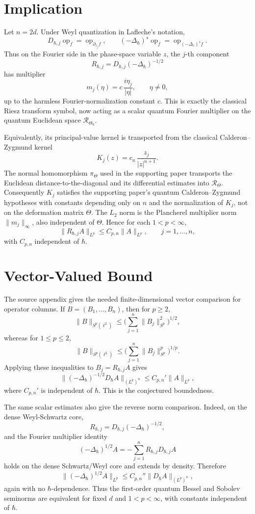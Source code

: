 \documentclass[11pt]{article}
\newcommand{\op}{\operatorname{op}}
\newcommand{\DD}{\Delta_{\hbar}}
\newcommand{\Dh}{D_{\hbar}}
\newcommand{\Lp}{L^p}
\begin{document}
\section*{Implication}

Let \(n=2d\).  Under Weyl quantization in Lafleche's notation,
\[
  D_{\hbar,j}\op_f=\op_{\partial_{z_j}f},
  \qquad
  (-\DD)^s\op_f=\op_{(-\Delta_z)^s f}.
\]
Thus on the Fourier side in the phase-space variable \(z\), the \(j\)-th
component
\[
  R_{\hbar,j}=D_{\hbar,j}(-\DD)^{-1/2}
\]
has multiplier
\[
  m_j(\eta)=c\,\frac{i\eta_j}{|\eta|},
  \qquad \eta\ne 0,
\]
up to the harmless Fourier-normalization constant \(c\).  This is exactly the
classical Riesz transform symbol, now acting as a scalar quantum Fourier
multiplier on the quantum Euclidean space \(\mathcal R_{\Theta_\hbar}\).

Equivalently, its principal-value kernel is transported from the classical
Calderon--Zygmund kernel
\[
  K_j(z)=c_n\,\frac{z_j}{|z|^{n+1}}.
\]
The normal homomorphism \(\pi_\Theta\) used in the supporting paper transports
the Euclidean distance-to-the-diagonal and its differential estimates into
\(\mathcal R_\Theta\).  Consequently \(K_j\) satisfies the supporting paper's
quantum Calderon--Zygmund hypotheses with constants depending only on \(n\)
and the normalization of \(K_j\), not on the deformation matrix \(\Theta\).
The \(L_2\) norm is the Plancherel multiplier norm \(\|m_j\|_\infty\), also
independent of \(\Theta\).  Hence for each \(1<p<\infty\),
\[
  \|R_{\hbar,j}A\|_{\Lp}\le C_{p,n}\|A\|_{\Lp},
  \qquad j=1,\ldots,n,
\]
with \(C_{p,n}\) independent of \(\hbar\).

\section*{Vector-Valued Bound}

The source appendix gives the needed finite-dimensional vector comparison for
operator columns.  If \(B=(B_1,\ldots,B_n)\), then for \(p\ge2\),
\[
  \|B\|_{S^p(\ell^2)}
  \le \Big(\sum_{j=1}^n \|B_j\|_{S^p}^2\Big)^{1/2},
\]
whereas for \(1\le p\le2\),
\[
  \|B\|_{S^p(\ell^2)}
  \le \Big(\sum_{j=1}^n \|B_j\|_{S^p}^p\Big)^{1/p}.
\]
Applying these inequalities to \(B_j=R_{\hbar,j}A\) gives
\[
  \|(-\DD)^{-1/2}\Dh A\|_{(\Lp)^n}
  \le C_{p,n}'\|A\|_{\Lp},
\]
where \(C_{p,n}'\) is independent of \(\hbar\).  This is the conjectured
boundedness.

The same scalar estimates also give the reverse norm comparison.  Indeed, on
the dense Weyl-Schwartz core,
\[
  R_{\hbar,j}=D_{\hbar,j}(-\DD)^{-1/2},
\]
and the Fourier multiplier identity
\[
  (-\DD)^{1/2}A=-\sum_{j=1}^n R_{\hbar,j}D_{\hbar,j} A
\]
holds on the dense Schwartz/Weyl core and extends by density.  Therefore
\[
  \|(-\DD)^{1/2}A\|_{\Lp}
  \le C_{p,n}''\|\Dh A\|_{(\Lp)^n},
\]
again with no \(\hbar\)-dependence.  Thus the first-order quantum Bessel and
Sobolev seminorms are equivalent for fixed \(d\) and \(1<p<\infty\), with
constants independent of \(\hbar\).
\end{document}

